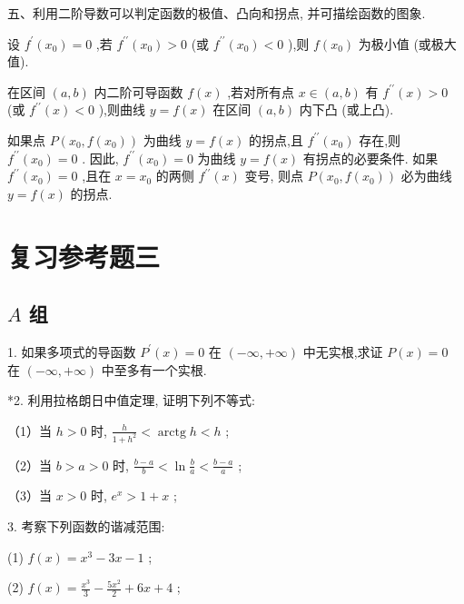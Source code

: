 \documentclass[lang=cn,newtx,10pt,scheme=chinese]{elegantbook}
\begin{document}
五、利用二阶导数可以判定函数的极值、凸向和拐点, 并可描绘函数的图象.

设 \({f}^{\prime }\left( {x}_{0}\right) = 0\) ,若 \({f}^{\prime \prime }\left( {x}_{0}\right) > 0\) (或 \({f}^{\prime \prime }\left( {x}_{0}\right) < 0\) ),则 \(f\left( {x}_{0}\right)\) 为极小值 (或极大值).

在区间 \(\left( {a,b}\right)\) 内二阶可导函数 \(f\left( x\right)\) ,若对所有点 \(x \in \left( {a,b}\right)\) 有 \({f}^{\prime \prime }\left( x\right) > 0\) (或 \({f}^{\prime \prime }\left( x\right) < 0\) ),则曲线 \(y = f\left( x\right)\) 在区间 \(\left( {a,b}\right)\) 内下凸 (或上凸).

如果点 \(P\left( {{x}_{0},f\left( {x}_{0}\right) }\right)\) 为曲线 \(y = f\left( x\right)\) 的拐点,且 \({f}^{\prime \prime }\left( {x}_{0}\right)\) 存在,则 \({f}^{\prime \prime }\left( {x}_{0}\right) = 0\) . 因此, \({f}^{\prime \prime }\left( {x}_{0}\right) = 0\) 为曲线 \(y = f\left( x\right)\) 有拐点的必要条件. 如果 \({f}^{\prime \prime }\left( {x}_{0}\right) = 0\) ,且在 \(x = {x}_{0}\) 的两侧 \({f}^{\prime \prime }\left( x\right)\) 变号, 则点 \(P\left( {{x}_{0},f\left( {x}_{0}\right) }\right)\) 必为曲线 \(y = f\left( x\right)\) 的拐点.

\chapter*{复习参考题三}

\section*{\(A\) 组}

1. 如果多项式的导函数 \({P}^{\prime }\left( x\right) = 0\) 在 \(\left( {-\infty , + \infty }\right)\) 中无实根,求证 \(P\left( x\right) = 0\) 在 \(\left( {-\infty , + \infty }\right)\) 中至多有一个实根.

*2. 利用拉格朗日中值定理, 证明下列不等式:

（1）当 \(h > 0\) 时, \(\frac{h}{1 + {h}^{2}} < \operatorname{arctg}h < h\) ;

（2）当 \(b > a > 0\) 时, \(\frac{b - a}{b} < \ln \frac{b}{a} < \frac{b - a}{a}\) ;

（3）当 \(x > 0\) 时, \({e}^{x} > 1 + x\) ;

3. 考察下列函数的谐减范围:

(1) \(f\left( x\right) = {x}^{3} - {3x} - 1\) ;

(2) \(f\left( x\right) = \frac{{x}^{3}}{3} - \frac{5{x}^{2}}{2} + {6x} + 4\) ;
\end{document}
